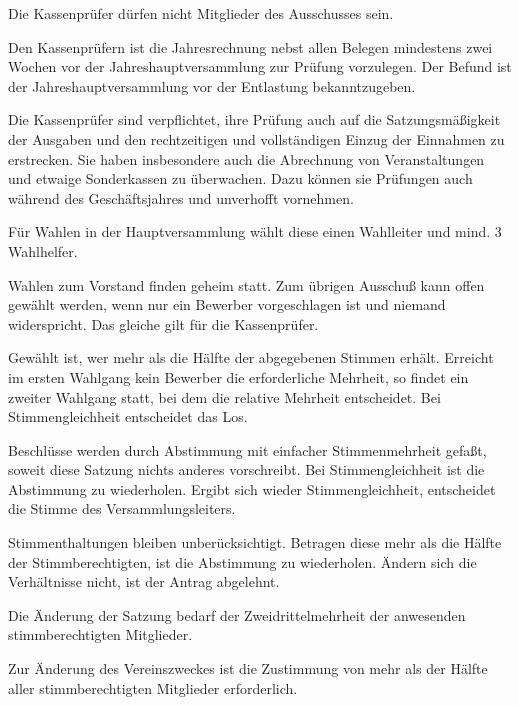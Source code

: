 \documentclass[10pt,a4paper,parskip=half]{scrartcl}
\begin{document}
\begin{contract}
    Die Kassenprüfer dürfen nicht Mitglieder des Ausschusses sein.
    
    Den Kassenprüfern ist die Jahresrechnung nebst allen Belegen mindestens zwei Wochen vor der Jahreshauptversammlung zur Prüfung vorzulegen. 
    Der Befund ist der Jahreshauptversammlung vor der Entlastung bekanntzugeben.
    
    Die Kassenprüfer sind verpflichtet,
    ihre Prüfung auch auf die Satzungsmäßigkeit der Ausgaben und den rechtzeitigen und vollständigen Einzug der Einnahmen zu erstrecken.
    Sie haben insbesondere auch die Abrechnung von Veranstaltungen und etwaige Sonderkassen zu überwachen.
    Dazu können sie Prüfungen auch während des Geschäftsjahres und unverhofft vornehmen.
    
    \label{C:WahlenUndAbstimmungen}
    Für Wahlen in der Hauptversammlung wählt diese einen Wahlleiter und mind. 3 Wahlhelfer.
    
    Wahlen zum Vorstand finden geheim statt.
    Zum übrigen Ausschuß kann offen gewählt werden,
    wenn nur ein Bewerber vorgeschlagen ist und niemand widerspricht.
    Das gleiche gilt für die Kassenprüfer.
    
    Gewählt ist,
    wer mehr als die Hälfte der abgegebenen Stimmen erhält.
    Erreicht im ersten Wahlgang kein Bewerber die erforderliche Mehrheit,
    so findet ein zweiter Wahlgang statt,
    bei dem die relative Mehrheit entscheidet.
    Bei Stimmengleichheit entscheidet das Los.
    
    Beschlüsse werden durch Abstimmung mit einfacher Stimmenmehrheit gefaßt,
    soweit diese Satzung nichts anderes vorschreibt.
    Bei Stimmengleichheit ist die Abstimmung zu wiederholen.
    Ergibt sich wieder Stimmengleichheit,
    entscheidet die Stimme des Versammlungsleiters.
    
    Stimmenthaltungen bleiben unberücksichtigt.
    Betragen diese mehr als die Hälfte der Stimmberechtigten,
    ist die Abstimmung zu wiederholen.
    Ändern sich die Verhältnisse nicht,
    ist der Antrag abgelehnt.
    
    Die Änderung der Satzung bedarf der Zweidrittelmehrheit der anwesenden stimmberechtigten Mitglieder.
    
    Zur Änderung des Vereinszweckes ist die Zustimmung von mehr als der Hälfte aller stimmberechtigten Mitglieder erforderlich.
    

\end{contract}
\end{document}
